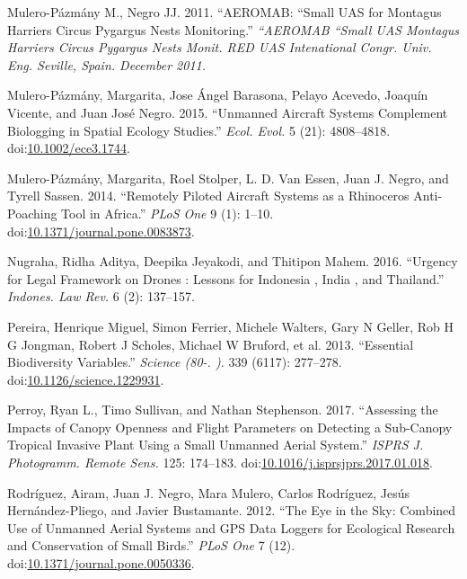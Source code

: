 \documentclass[]{interact}
\theoremstyle{plain}%
\theoremstyle{definition}
\theoremstyle{remark}
\begin{document}
\hypertarget{ref-mulero-pazmany_m_aeromab_2011}{}
Mulero-Pázmány M., Negro JJ. 2011. ``AEROMAB: ``Small UAS for Montagus
Harriers Circus Pygargus Nests Monitoring.'' \emph{``AEROMAB ``Small UAS
Montagus Harriers Circus Pygargus Nests Monit. RED UAS Intenational
Congr. Univ. Eng. Seville, Spain. December 2011.}

\hypertarget{ref-mulero-pazmany_unmanned_2015}{}
Mulero-Pázmány, Margarita, Jose Ángel Barasona, Pelayo Acevedo, Joaquín
Vicente, and Juan José Negro. 2015. ``Unmanned Aircraft Systems
Complement Biologging in Spatial Ecology Studies.'' \emph{Ecol. Evol.} 5
(21): 4808--4818.
doi:\href{https://doi.org/10.1002/ece3.1744}{10.1002/ece3.1744}.

\hypertarget{ref-mulero-pazmany_remotely_2014}{}
Mulero-Pázmány, Margarita, Roel Stolper, L. D. Van Essen, Juan J. Negro,
and Tyrell Sassen. 2014. ``Remotely Piloted Aircraft Systems as a
Rhinoceros Anti-Poaching Tool in Africa.'' \emph{PLoS One} 9 (1): 1--10.
doi:\href{https://doi.org/10.1371/journal.pone.0083873}{10.1371/journal.pone.0083873}.

\hypertarget{ref-nugraha_urgency_2016}{}
Nugraha, Ridha Aditya, Deepika Jeyakodi, and Thitipon Mahem. 2016.
``Urgency for Legal Framework on Drones : Lessons for Indonesia , India
, and Thailand.'' \emph{Indones. Law Rev.} 6 (2): 137--157.

\hypertarget{ref-pereira_essential_2013}{}
Pereira, Henrique Miguel, Simon Ferrier, Michele Walters, Gary N Geller,
Rob H G Jongman, Robert J Scholes, Michael W Bruford, et al. 2013.
``Essential Biodiversity Variables.'' \emph{Science (80-. ).} 339
(6117): 277--278.
doi:\href{https://doi.org/10.1126/science.1229931}{10.1126/science.1229931}.

\hypertarget{ref-perroy_assessing_2017}{}
Perroy, Ryan L., Timo Sullivan, and Nathan Stephenson. 2017. ``Assessing
the Impacts of Canopy Openness and Flight Parameters on Detecting a
Sub-Canopy Tropical Invasive Plant Using a Small Unmanned Aerial
System.'' \emph{ISPRS J. Photogramm. Remote Sens.} 125: 174--183.
doi:\href{https://doi.org/10.1016/j.isprsjprs.2017.01.018}{10.1016/j.isprsjprs.2017.01.018}.

\hypertarget{ref-rodriguez_eye_2012}{}
Rodríguez, Airam, Juan J. Negro, Mara Mulero, Carlos Rodríguez, Jesús
Hernández-Pliego, and Javier Bustamante. 2012. ``The Eye in the Sky:
Combined Use of Unmanned Aerial Systems and GPS Data Loggers for
Ecological Research and Conservation of Small Birds.'' \emph{PLoS One} 7
(12).
doi:\href{https://doi.org/10.1371/journal.pone.0050336}{10.1371/journal.pone.0050336}.
\end{document}
